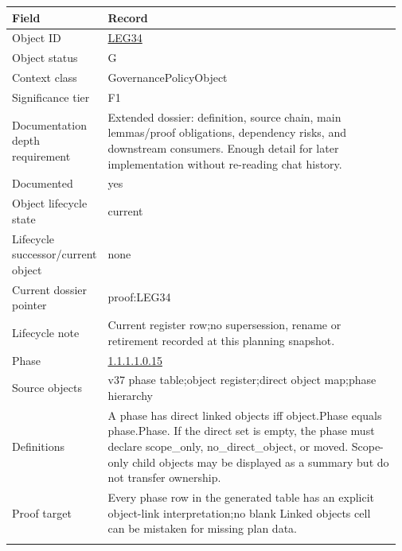 \begin{longtable}{L{0.16\linewidth} L{0.81\linewidth}}
\hline
\textbf{Field} & \textbf{Record}\\
\hline
Object ID & \hyperlink{object-row-LEG34}{LEG34}\\
\hline\addlinespace[0.20em]
Object status & G\\
\hline\addlinespace[0.20em]
Context class & GovernancePolicyObject\\
\hline\addlinespace[0.20em]
Significance tier & F1\\
\hline\addlinespace[0.20em]
Documentation depth requirement & Extended dossier: definition, source chain, main lemmas/\allowbreak{}proof obligations, dependency risks, and downstream consumers. Enough detail for later implementation without re-reading chat history.\\
\hline\addlinespace[0.20em]
Documented & yes\\
\hline\addlinespace[0.20em]
Object lifecycle state & current\\
\hline\addlinespace[0.20em]
Lifecycle successor/\allowbreak{}current object & none\\
\hline\addlinespace[0.20em]
Current dossier pointer & proof:LEG34\\
\hline\addlinespace[0.20em]
Lifecycle note & Current register row;\newline no supersession, rename or retirement recorded at this planning snapshot.\\
\hline\addlinespace[0.20em]
Phase & \hyperlink{phase-row-1-1-1-1-0-15}{1.1.1.1.0.15}\\
\hline\addlinespace[0.20em]
Source objects & v37 phase table;\newline object register;\newline direct object map;\newline phase hierarchy\\
\hline\addlinespace[0.20em]
Definitions & A phase has direct linked objects iff object.Phase equals phase.Phase. If the direct set is empty, the phase must declare scope\_only, no\_direct\_object, or moved. Scope-only child objects may be displayed as a summary but do not transfer ownership.\\
\hline\addlinespace[0.20em]
Proof target & Every phase row in the generated table has an explicit object-link interpretation;\newline no blank Linked objects cell can be mistaken for missing plan data.\\
\hline\addlinespace[0.20em]

\end{longtable}
